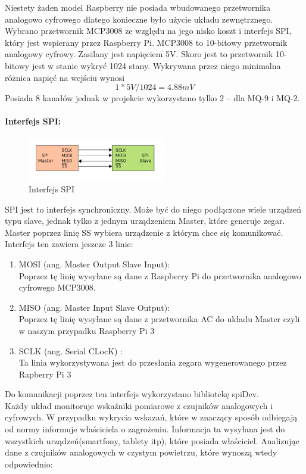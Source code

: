 Niestety żaden model Raspberry nie posiada wbudowanego przetwornika analogowo cyfrowego dlatego konieczne było użycie układu zewnętrznego. Wybrano przetwornik MCP3008 ze względu na jego nisko koszt i interfejs SPI, który jest wspierany przez Raspberry Pi.
MCP3008 to 10-bitowy przetwornik analogowy cyfrowy. Zasilany jest napięciem 5V.  Skoro jest to przetwornik 10-bitowy jest w stanie wykryć 1024 stany. Wykrywana przez niego minimalna różnica napięć na wejściu wynosi 
\begin{equation}
1 * 5V / 1024 = 4.88mV
\end{equation}
Posiada 8 kanałów jednak w projekcie wykorzystano tylko 2 – dla MQ-9 i MQ-2.
\paragraph{Interfejs SPI:}
\begin{figure}[h]
	\centering
	\includegraphics[width=6cm]{SPI.png}
	\caption{Interfejs SPI}
\end{figure}
SPI jest to interfejs synchroniczny. Może być do niego podłączone wiele urządzeń typu slave, jednak tylko z jednym urządzeniem Master, które generuje zegar. Master poprzez linię SS wybiera urządzenie z którym chce się komunikować.  \\
Interfejs ten zawiera jeszcze 3 linie:
\begin{enumerate} 
\item MOSI (ang. Master Output Slave Input): \\
Poprzez tę linię wysyłane są dane z Raspberry Pi do przetwornika analogowo cyfrowego MCP3008.
\item MISO (ang. Master Input Slave Output):\\
Poprzez tę linię wysyłane są dane z przetwornika AC do układu Master czyli w naszym przypadku Raspberry Pi 3
\item SCLK (ang. Serial CLocK) :\\
Ta linia wykorzystywana jest do przesłania zegara wygenerowanego przez Rapberry Pi 3
\end{enumerate}
Do komunikacji poprzez ten interfejs wykorzystano bibliotekę spiDev. \\
Każdy układ monitoruje wskaźniki pomiarowe z czujników analogowych i cyfrowych. W przypadku wykrycia wskazań, które w znaczący sposób odbiegają od normy informuje właściciela o zagrożeniu. Informacja ta wysyłana jest do wszystkich urządzeń(smartfony, tablety itp), które posiada właściciel.  Analizując dane z czujników analogowych w czystym powietrzu, które wynoszą wtedy odpowiednio:\\
